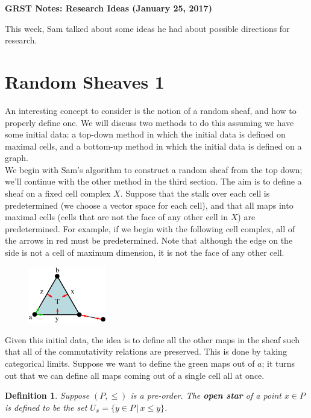 \documentclass{article}
\newtheorem{definition}{Definition}
\theoremstyle{definition}
\begin{document}
\begin{center}
	\large \textbf{GRST Notes: Research Ideas (January 25, 2017)} \\
\end{center}

This week, Sam talked about some ideas he had about possible directions for research. 

\section{Random Sheaves 1}
An interesting concept to consider is the notion of a random sheaf, and how to properly define one. We will discuss two methods to do this assuming we have some initial data: a top-down method in which the initial data is defined on maximal cells, and a bottom-up method in which the initial data is defined on a graph.\\

We begin with Sam's algorithm to construct a random sheaf from the top down; we'll continue with the other method in the third section. The aim is to define a sheaf on a fixed cell complex $X$. Suppose that the stalk over each cell is predetermined (we choose a vector space for each cell), and that all maps into maximal cells (cells that are not the face of any other cell in $X$) are predetermined. For example, if we begin with the following cell complex, all of the arrows in red must be predetermined. Note that although the edge on the side is not a cell of maximum dimension, it is not the face of any other cell.

\begin{figure}[!htbp]
\centering
	\includegraphics[width=0.3\textwidth]{images/cellcomp.eps}
\end{figure}

Given this initial data, the idea is to define all the other maps in the sheaf such that all of the commutativity relations are preserved. This is done by taking categorical limits. Suppose we want to define the green maps out of $a$; it turns out that we can define all maps coming out of a single cell all at once. 

\begin{definition} Suppose $(P, \leq)$ is a pre-order. The \textbf{open star} of a point $x \in P$ is defined to be the set $U_x = \{y \in P \, | \, x \leq y\}$.
\end{definition}
\end{document}
